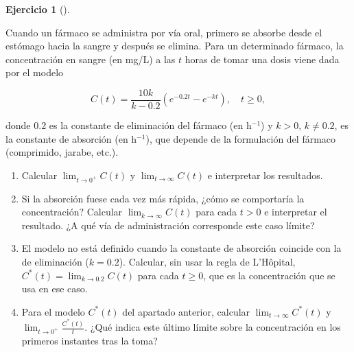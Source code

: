 \documentclass[
  spanish,
  a4paper,
]{scrreport}
\theoremstyle{definition}
\newtheorem{exercise}{Ejercicio}[chapter]
\theoremstyle{remark}
\begin{document}
\begin{exercise}[]\protect\hypertarget{exr-3}{}\label{exr-3}

Cuando un fármaco se administra por vía oral, primero se absorbe desde
el estómago hacia la sangre y después se elimina. Para un determinado
fármaco, la concentración en sangre (en mg/L) a las \(t\) horas de tomar
una dosis viene dada por el modelo

\[
C(t) = \frac{10k}{k-0.2}\left(e^{-0.2t}-e^{-kt}\right), \quad t\geq 0,
\]

donde \(0.2\) es la constante de eliminación del fármaco (en h\(^{-1}\))
y \(k>0\), \(k\neq 0.2\), es la constante de absorción (en h\(^{-1}\)),
que depende de la formulación del fármaco (comprimido, jarabe, etc.).

\begin{enumerate}
\def\labelenumi{\alph{enumi}.}
\item
  Calcular \(\lim_{t\to 0^+}C(t)\) y \(\lim_{t\to\infty}C(t)\) e
  interpretar los resultados.
\item
  Si la absorción fuese cada vez más rápida, ¿cómo se comportaría la
  concentración? Calcular \(\lim_{k\to\infty}C(t)\) para cada \(t>0\) e
  interpretar el resultado. ¿A qué vía de administración corresponde
  este caso límite?
\item
  El modelo no está definido cuando la constante de absorción coincide
  con la de eliminación (\(k=0.2\)). Calcular, sin usar la regla de
  L'Hôpital, \(C^*(t) = \lim_{k\to 0.2}C(t)\) para cada \(t\geq 0\), que
  es la concentración que se usa en ese caso.
\item
  Para el modelo \(C^*(t)\) del apartado anterior, calcular
  \(\lim_{t\to\infty}C^*(t)\) y \(\lim_{t\to 0^+}\frac{C^*(t)}{t}\).
  ¿Qué indica este último límite sobre la concentración en los primeros
  instantes tras la toma?
\end{enumerate}

\end{exercise}
\end{document}
